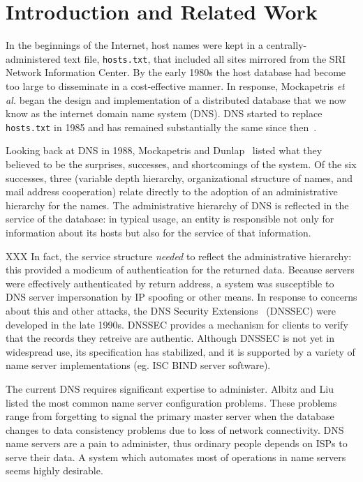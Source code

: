 \section{Introduction and Related Work}

In the beginnings of the Internet, host names were kept
in a centrally-administered text file, {\tt hosts.txt}, that
included all sites mirrored from the SRI Network Information Center.
By the early 1980s the host database had become too large
to disseminate in a cost-effective manner.
In response, Mockapetris {\it et al.} began the design and
implementation of a distributed database that we now know
as the internet domain name system (DNS).
DNS started to replace {\tt hosts.txt} in 1985 and has remained
substantially the same since then~\cite{dns-concept:rfc, dns}.

Looking back at DNS in 1988, Mockapetris and Dunlap~\cite{dns}
listed what they believed to be the surprises, successes,
and shortcomings of the system.  Of the six successes,
three (variable depth hierarchy, organizational structure
of names, and mail address cooperation) relate directly 
to the adoption of an administrative hierarchy for the names.
The administrative hierarchy of DNS is reflected in the 
service of the database: in typical usage, an
entity is responsible not only for information about its hosts
but also for the service of that information.

XXX In fact, the service structure {\em needed} to reflect the 
administrative hierarchy: this provided a modicum of authentication
for the returned data. Because servers were effectively 
authenticated by return address,
a system was susceptible to DNS server impersonation by 
IP spoofing or other means.
In response to concerns about this and
other attacks, the DNS Security Extensions~\cite{dnssec:rfc}
 (DNSSEC) were developed in the late 1990s.
DNSSEC provides a mechanism for clients to verify that the
records they retreive are authentic.
Although DNSSEC is not yet in widespread use, its specification
has stabilized, and it is supported by a variety of name server
implementations (eg. ISC BIND server software). 

The current DNS requires significant expertise to administer.
Albitz and Liu~\cite{dns-bind} listed the most common 
name server configuration problems. These problems range from
forgetting to signal the primary master server when the database
changes to data consistency problems due to loss of network 
connectivity. DNS name servers are a pain to administer, thus
ordinary people depends on ISPs to serve their data. A system
which automates most of operations in name servers seems highly
desirable.

